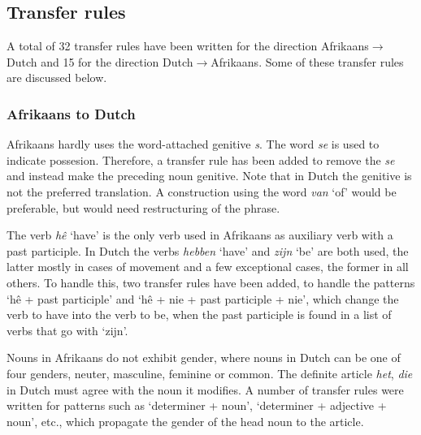 \documentclass[11pt]{article}
\begin{document}
\subsection{Transfer rules}

A total of 32 transfer rules have been written for the direction Afrikaans$\rightarrow$Dutch and
15 for the direction Dutch$\rightarrow$Afrikaans. Some of these transfer rules are discussed 
below.

\subsubsection{Afrikaans to Dutch}


Afrikaans hardly uses the word-attached genitive \cite{Donaldson:93} \emph{s}. The word \emph{se} is used to indicate possesion. 
Therefore, a transfer rule has been added to remove the \emph{se} and instead make the preceding
noun genitive. Note that in Dutch the genitive is not the preferred translation. A construction using
the word \emph{van} `of' would be preferable, but would need restructuring of the phrase. 


The verb \emph{hê} `have' is the only verb used in Afrikaans as auxiliary
verb with a past participle. In Dutch the verbs \emph{hebben} `have' and \emph{zijn} `be' 
are both used, the latter mostly in cases of movement and a few exceptional cases, the
former in all others. To handle this, two transfer rules have been added, to handle the
patterns `hê + past participle' and `hê + nie + past participle + nie', which change the
verb to have into the verb to be, when the past participle is found in a list of verbs that go with
`zijn'.



Nouns in Afrikaans do not exhibit gender, where nouns in Dutch can be one of four genders,
neuter, masculine, feminine or common. The definite article \emph{het}, \emph{die} in Dutch must agree with 
the noun it modifies. A number of transfer rules were written for patterns such as `determiner + noun',
`determiner + adjective + noun', etc., which propagate the gender of the head noun to the article.
\end{document}
